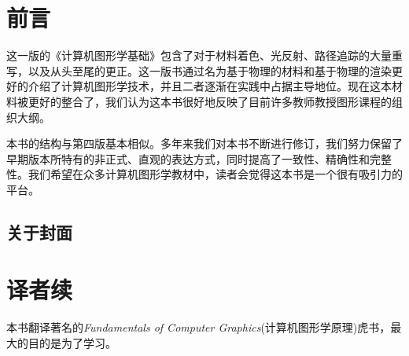 

\chapter*{前言}

这一版的《计算机图形学基础》包含了对于材料着色、光反射、路径追踪的大量重写，以及从头至尾的更正。这一版书通过名为基于物理的材料和基于物理的渲染更好的介绍了计算机图形学技术，并且二者逐渐在实践中占据主导地位。现在这本材料被更好的整合了，我们认为这本书很好地反映了目前许多教师教授图形课程的组织大纲。

本书的结构与第四版基本相似。多年来我们对本书不断进行修订，我们努力保留了早期版本所特有的非正式、直观的表达方式，同时提高了一致性、精确性和完整性。我们希望在众多计算机图形学教材中，读者会觉得这本书是一个很有吸引力的平台。

\section*{关于封面}





\chapter*{译者续}

本书翻译著名的\textit{Fundamentals of Computer Graphics}(计算机图形学原理)虎书，最大的目的是为了学习。